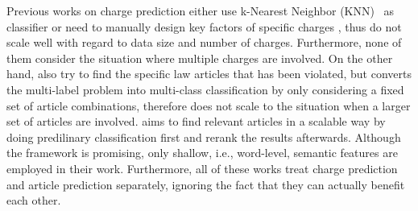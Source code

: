 Previous works on charge prediction either use k-Nearest Neighbor (KNN)~\cite{LIU2004case,liu2006exploring} as classifier or need to manually design key factors of specific charges \cite{lin2012exploiting}, thus do not scale well with regard to data size and number of charges. Furthermore, none of them consider the situation where multiple charges are involved. On the other hand, \cite{liu2005classifying,liu2006exploring} also try to find the specific law articles that has been violated, but converts the multi-label problem into multi-class classification by only considering a fixed set of article combinations, therefore does not scale to the situation when a larger set of articles are involved. \cite{liu2015predicting} aims to find relevant articles in a scalable way by doing predilinary classification first and rerank the results afterwards. Although the framework is promising, only shallow, i.e., word-level, semantic features are employed in their work. Furthermore, all of these works treat charge prediction and article prediction separately, ignoring the fact that they can actually benefit each other. 




